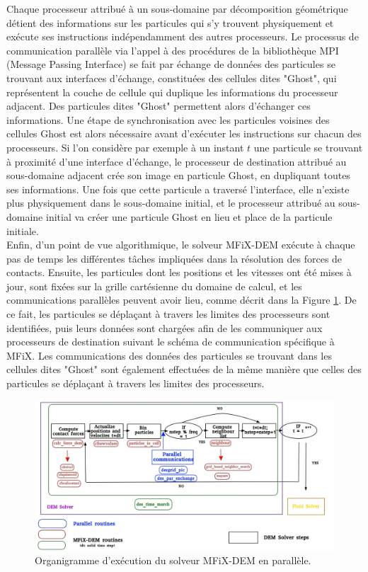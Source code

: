 Chaque processeur attribué à un sous-domaine par décomposition géométrique détient des informations sur les particules qui s'y trouvent physiquement et exécute ses instructions indépendamment des autres processeurs. Le processus de communication parallèle via l'appel à des procédures de la bibliothèque MPI (Message Passing Interface) se fait par échange de données des particules se trouvant aux interfaces d'échange, constituées des cellules dites "Ghost", qui représentent la couche de cellule qui duplique les informations du processeur adjacent. Des particules dites "Ghost" permettent alors d'échanger ces informations. Une étape de synchronisation avec les particules voisines des cellules Ghost est alors nécessaire avant d'exécuter les instructions sur chacun des processeurs.  Si l'on considère par exemple à un instant $t$ une particule se trouvant à proximité d'une interface d'échange, le processeur de destination attribué au sous-domaine adjacent crée son image en particule Ghost, en dupliquant toutes ses informations. Une fois que cette particule a traversé l'interface, elle n'existe plus physiquement dans le sous-domaine initial, et le processeur attribué au sous-domaine initial va créer une particule Ghost en lieu et place de la particule initiale.\\

Enfin, d'un point de vue algorithmique, le solveur MFiX-DEM exécute à chaque pas de temps les différentes tâches impliquées dans la résolution des forces de contacts. Ensuite, les particules dont les positions et les vitesses ont été mises à jour, sont fixées sur la grille cartésienne du domaine de calcul, et les communications parallèles peuvent avoir lieu, comme décrit dans la Figure \ref{fig8}. De ce fait, les particules se déplaçant à travers les limites des processeurs sont identifiées, puis leurs données sont chargées afin de les communiquer aux processeurs de destination suivant le schéma de communication spécifique à MFiX. Les communications des données des particules se trouvant dans les cellules dites "Ghost" sont également effectuées de la même manière que celles des particules se déplaçant à travers les limites des processeurs. 

\begin{figure}[!h]
        \centering
        \includegraphics[width=1.0\textwidth]{chapitres/chapitre_4/figures/parallel_dem_solver_scheme.jpg}
        \caption{Organigramme d'exécution du solveur MFiX-DEM en parallèle.}
        \label{fig8}    
    \end{figure}

